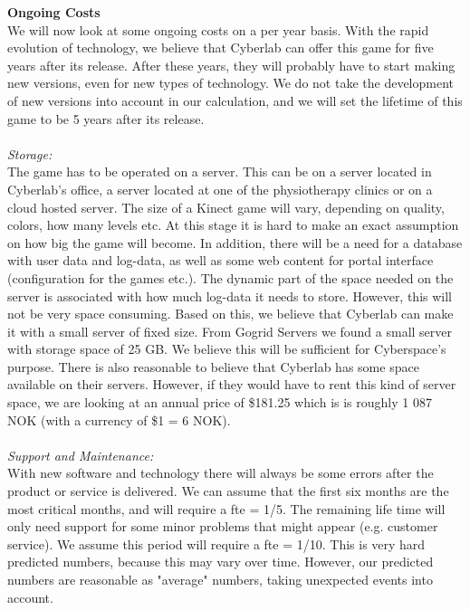 \newpage
\textbf{Ongoing Costs}\\
We will now look at some ongoing costs on a per year basis. With the rapid evolution of technology, we believe that Cyberlab can offer this game for five years after its release. After these years, they will probably have to start making new versions, even for new types of technology. We do not take the development of new versions into account in our calculation, and we will set the lifetime of this game to be 5 years after its release.\\ \\
\emph{Storage:}\\
The game has to be operated on a server. This can be on a server located in Cyberlab’s office, a server located at one of the physiotherapy clinics or on a cloud hosted server. The size of a Kinect game will vary, depending on quality, colors, how many levels etc. At this stage it is hard to make an exact assumption on how big the game will become. In addition, there will be a need for a database with user data and log-data, as well as some web content for portal interface (configuration for the games etc.). The dynamic part of the space needed on the server is associated with how much log-data it needs to store. However, this will not be very space consuming. Based on this, we believe that Cyberlab can make it with a small server of fixed size. From Gogrid Servers \cite{priceserver} we found a small server with storage space of 25 GB. We believe this will be sufficient for Cyberspace's purpose. There is also reasonable to believe that Cyberlab has some space available on their servers. However, if they would have to rent this kind of server space, we are looking at an annual price of \$181.25 which is is roughly 1 087 NOK (with a currency of \$1 = 6 NOK).\\ \\
\emph{Support and Maintenance:}\\
With new software and technology there will always be some errors after the product or service is delivered. We can assume that the first six months are the most critical months, and will require a \ac{fte} = 1/5. The remaining life time will only need support for some minor problems that might appear (e.g. customer service). We assume this period will require a \ac{fte} = 1/10. This is very hard predicted numbers, because this may vary over time. However, our predicted numbers are reasonable as "average" numbers, taking unexpected events into account.  \\ \\
